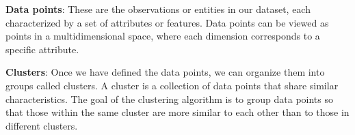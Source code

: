 \noindent \textbf{Data points}: These are the observations or entities in our dataset, each characterized by a set of attributes or features. Data points can be viewed as points in a multidimensional space, where each dimension corresponds to a specific attribute.

\noindent \textbf{Clusters}: Once we have defined the data points, we can organize them into groups called clusters. A cluster is a collection of data points that share similar characteristics. The goal of the clustering algorithm is to group data points so that those within the same cluster are more similar to each other than to those in different clusters.

